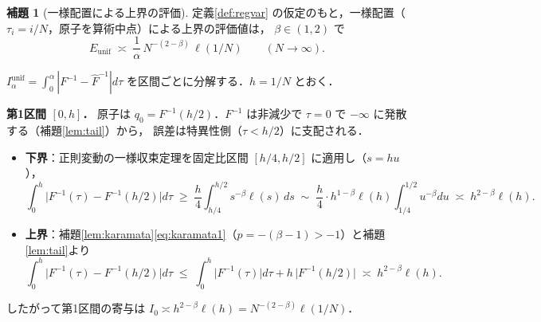 \documentclass[a4paper,10pt]{jsarticle}
\makeatletter
\theoremstyle{definition}
\newtheorem{lemma}{補題}[section]
\renewenvironment{proof}[1][\proofname]{\par
  \pushQED{\qed}%
  \normalfont \topsep6\p@\@plus6\p@\relax
  \trivlist
  \item[\hskip\labelsep\textbf{#1}]\ignorespaces
}{%
  \popQED\endtrivlist\@endpefalse
}
\renewcommand{\proofname}{証明}
\newcommand{\Finv}{F^{-1}}
\newcommand{\Fhinv}{\hat{F}^{-1}}
\makeatother
\begin{document}
\begin{lemma}[一様配置による上界の評価]
\label{lem:unif}
定義\ref{def:regvar} の仮定のもと，一様配置（$\tau_i=i/N$，原子を算術中点）による上界の評価値は，
$\beta\in(1,2)$ で
\begin{equation}
  E_{\mathrm{unif}}\;\asymp\;\frac1\alpha\,N^{-(2-\beta)}\,\ell(1/N)
  \qquad(N\to\infty).
  \label{eq:eunif}
\end{equation}
\end{lemma}
\begin{proof}
$I_\alpha^{\mathrm{unif}}=\int_0^\alpha|\Finv-\Fhinv|d\tau$ を区間ごとに分解する．$h=1/N$ とおく．

\noindent\textbf{第1区間 $[0,h]$．}
原子は $q_0=\Finv(h/2)$．$\Finv$ は非減少で $\tau=0$ で $-\infty$ に発散する（補題\ref{lem:tail}）から，
誤差は特異性側（$\tau<h/2$）に支配される．
\begin{itemize}
\item \textbf{下界}：正則変動の一様収束定理を固定比区間 $[h/4,h/2]$ に適用し（$s=hu$），
\begin{equation*}
\int_0^{h}\bigl|\Finv(\tau)-\Finv(h/2)\bigr|d\tau
\;\ge\;\frac{h}{4}\int_{h/4}^{h/2}s^{-\beta}\ell(s)\,ds
\;\sim\;\frac{h}{4}\cdot h^{1-\beta}\ell(h)\int_{1/4}^{1/2}u^{-\beta}du
\;\asymp\;h^{2-\beta}\ell(h).
\end{equation*}
\item \textbf{上界}：補題\ref{lem:karamata}\eqref{eq:karamata1}（$p=-(\beta-1)>-1$）と補題\ref{lem:tail}より
\begin{equation*}
\int_0^{h}\bigl|\Finv(\tau)-\Finv(h/2)\bigr|d\tau
\;\le\;\int_0^h\bigl|\Finv(\tau)\bigr|d\tau+h\,\bigl|\Finv(h/2)\bigr|
\;\asymp\;h^{2-\beta}\ell(h).
\end{equation*}
\end{itemize}
したがって第1区間の寄与は $I_0\asymp h^{2-\beta}\ell(h)=N^{-(2-\beta)}\ell(1/N)$．


\end{proof}
\end{document}

